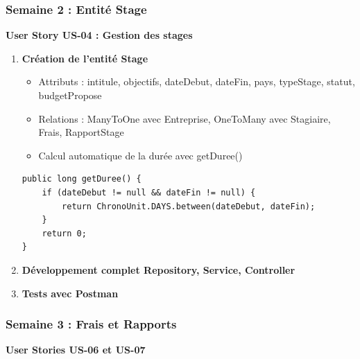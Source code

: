 \documentclass[12pt,a4paper]{report}
\begin{document}
\subsubsection{Semaine 2 : Entité Stage}

\textbf{User Story US-04 : Gestion des stages}

\begin{enumerate}[leftmargin=1cm]
    \item \textbf{Création de l'entité Stage}
    \begin{itemize}
        \item Attributs : intitule, objectifs, dateDebut, dateFin, pays, typeStage, statut, budgetPropose
        \item Relations : ManyToOne avec Entreprise, OneToMany avec Stagiaire, Frais, RapportStage
        \item Calcul automatique de la durée avec getDuree()
    \end{itemize}
    
    \begin{lstlisting}[caption={Calcul de la durée dans Stage.java}]
public long getDuree() {
    if (dateDebut != null && dateFin != null) {
        return ChronoUnit.DAYS.between(dateDebut, dateFin);
    }
    return 0;
}
\end{lstlisting}
    
    \item \textbf{Développement complet Repository, Service, Controller}
    \item \textbf{Tests avec Postman}
\end{enumerate}

\subsubsection{Semaine 3 : Frais et Rapports}

\textbf{User Stories US-06 et US-07}
\end{document}
